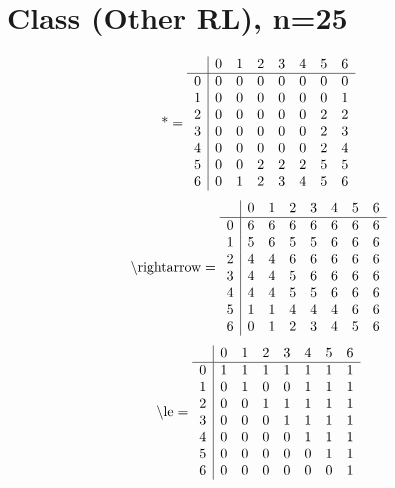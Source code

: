 \documentclass[11pt]{article}
\begin{document}
\section{Class (Other RL), n=25}
\[\text{*} = 
\begin{array}{r | r r r r r r r}
 & 0 & 1 & 2 & 3 & 4 & 5 & 6 \\ \hline
0 & 0 & 0 & 0 & 0 & 0 & 0 & 0 \\
1 & 0 & 0 & 0 & 0 & 0 & 0 & 1 \\
2 & 0 & 0 & 0 & 0 & 0 & 2 & 2 \\
3 & 0 & 0 & 0 & 0 & 0 & 2 & 3 \\
4 & 0 & 0 & 0 & 0 & 0 & 2 & 4 \\
5 & 0 & 0 & 2 & 2 & 2 & 5 & 5 \\
6 & 0 & 1 & 2 & 3 & 4 & 5 & 6 \\
\end{array}
\]
\[\text{\textbackslash rightarrow} = 
\begin{array}{r | r r r r r r r}
 & 0 & 1 & 2 & 3 & 4 & 5 & 6 \\ \hline
0 & 6 & 6 & 6 & 6 & 6 & 6 & 6 \\
1 & 5 & 6 & 5 & 5 & 6 & 6 & 6 \\
2 & 4 & 4 & 6 & 6 & 6 & 6 & 6 \\
3 & 4 & 4 & 5 & 6 & 6 & 6 & 6 \\
4 & 4 & 4 & 5 & 5 & 6 & 6 & 6 \\
5 & 1 & 1 & 4 & 4 & 4 & 6 & 6 \\
6 & 0 & 1 & 2 & 3 & 4 & 5 & 6 \\
\end{array}
\]
\[\text{\textbackslash le} = 
\begin{array}{r | r r r r r r r}
 & 0 & 1 & 2 & 3 & 4 & 5 & 6 \\ \hline
0 & 1 & 1 & 1 & 1 & 1 & 1 & 1 \\
1 & 0 & 1 & 0 & 0 & 1 & 1 & 1 \\
2 & 0 & 0 & 1 & 1 & 1 & 1 & 1 \\
3 & 0 & 0 & 0 & 1 & 1 & 1 & 1 \\
4 & 0 & 0 & 0 & 0 & 1 & 1 & 1 \\
5 & 0 & 0 & 0 & 0 & 0 & 1 & 1 \\
6 & 0 & 0 & 0 & 0 & 0 & 0 & 1 \\
\end{array}
\]
\end{document}
